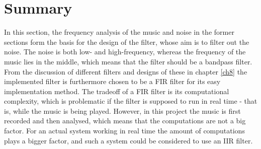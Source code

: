 \section{Summary} \label{sec:filtervalg}
In this section, the frequency analysis of the music and noise in the former sections form the basis for the design of the filter, whose aim is to filter out the noise. The noise is both low- and high-frequency, whereas the frequency of the music lies in the middle, which means that the filter should be a bandpass filter. From the discussion of different filters and designs of these in chapter \ref{ch8} the implemented filter is furthermore chosen to be a FIR filter for its easy implementation method. The tradeoff of a FIR filter is its computational complexity, which is problematic if the filter is supposed to run in real time - that is, while the music is being played. However, in this project the music is first recorded and then analysed, which means that the computations are not a big factor. For an actual system working in real time the amount of computations plays a bigger factor, and such a system could be considered to use an IIR filter.